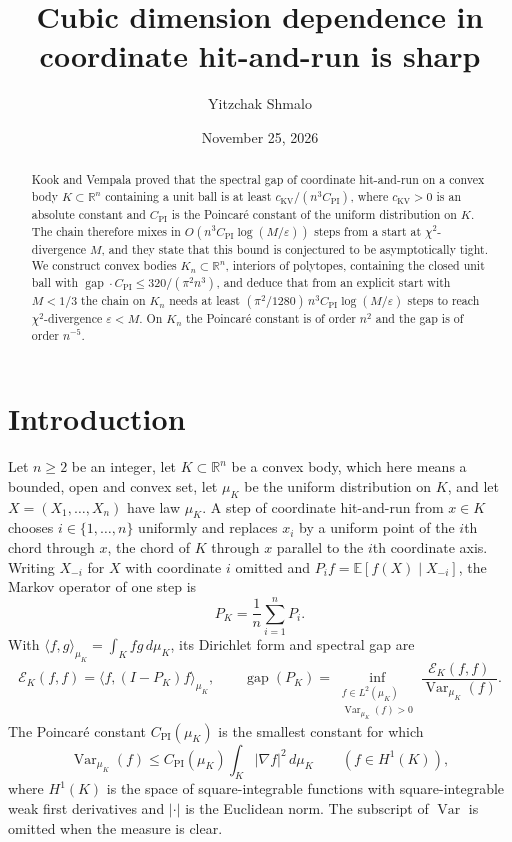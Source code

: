 \documentclass[11pt]{amsart}
\title{Cubic dimension dependence in coordinate hit-and-run is sharp}
\author{Yitzchak Shmalo}
\date{November 25, 2026}
\theoremstyle{remark}
\numberwithin{equation}{section}
\newcommand{\E}{\mathbb E}
\newcommand{\R}{\mathbb R}
\newcommand{\Var}{\operatorname{Var}}
\newcommand{\gap}{\operatorname{gap}}
\newcommand{\CPI}{C_{\mathrm{PI}}}
\begin{document}
\begin{abstract}
Kook and Vempala proved that the spectral gap of coordinate hit-and-run on
a convex body $K\subset\R^n$ containing a unit ball is at least
$c_{\mathrm{KV}}/(n^3\CPI)$, where $c_{\mathrm{KV}}>0$ is an absolute
constant and $\CPI$ is the Poincar\'e constant of the uniform distribution
on $K$. The chain therefore mixes in $O(n^3\CPI\log(M/\varepsilon))$ steps
from a start at $\chi^2$-divergence $M$, and they state that this bound is
conjectured to be asymptotically tight. We construct convex bodies $K_n\subset\R^n$, interiors of polytopes, containing the closed unit ball with
$\gap\cdot\CPI\le320/(\pi^2n^3)$, and deduce that from an explicit start
with $M<1/3$ the chain on $K_n$ needs at least
$(\pi^2/1280)\,n^3\CPI\log(M/\varepsilon)$ steps to reach
$\chi^2$-divergence $\varepsilon<M$. On $K_n$ the Poincar\'e constant is of order $n^2$ and the gap is
of order $n^{-5}$.
\end{abstract}
\maketitle

\section{Introduction}\label{sec:intro}
Let $n\ge2$ be an integer, let $K\subset\R^n$ be a convex body, which here means a bounded, open and
convex set, let $\mu_K$ be the uniform distribution on $K$, and let
$X=(X_1,\ldots,X_n)$ have law $\mu_K$. A step of coordinate hit-and-run
from $x\in K$ chooses $i\in\{1,\ldots,n\}$ uniformly and replaces $x_i$ by
a uniform point of the $i$th chord through $x$, the chord of $K$ through
$x$ parallel to the $i$th coordinate axis. Writing $X_{-i}$ for $X$ with coordinate $i$ omitted and
$P_if=\E[f(X)\mid X_{-i}]$, the Markov operator of one step is
\begin{equation}\label{eq:operator}
 P_K=\frac1n\sum_{i=1}^n P_i .
\end{equation}
With $\langle f,g\rangle_{\mu_K}=\int_K fg\,d\mu_K$, its Dirichlet form
and spectral gap are
\begin{equation}\label{eq:gap-def}
 \mathcal E_K(f,f)=\langle f,(I-P_K)f\rangle_{\mu_K},\qquad
 \gap(P_K)=\inf_{\substack{f\in L^2(\mu_K)\\\Var_{\mu_K}(f)>0}}
 \frac{\mathcal E_K(f,f)}{\Var_{\mu_K}(f)} .
\end{equation}
The Poincar\'e constant $\CPI(\mu_K)$ is the smallest constant for which
\begin{equation}\label{eq:pi-def}
 \Var_{\mu_K}(f)\le \CPI(\mu_K)\int_K |\nabla f|^2\,d\mu_K
 \qquad(f\in H^1(K)),
\end{equation}
where $H^1(K)$ is the space of square-integrable functions with
square-integrable weak first derivatives and $|\cdot|$ is the Euclidean
norm. The subscript of $\Var$ is omitted when the measure is clear.
\end{document}
